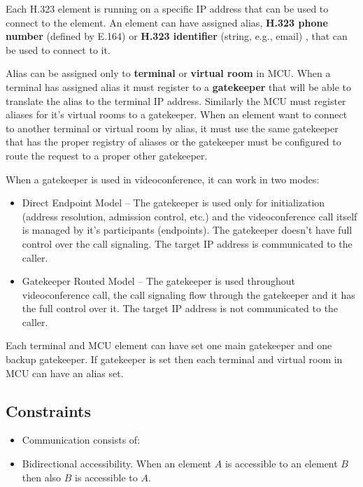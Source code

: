 Each H.323 element is running on a specific IP address that can be used to 
connect to the element. An element can have assigned alias, \textbf{H.323 
phone number} (defined by E.164) or \textbf{H.323 identifier} (string, e.g., 
email) , that can be used to connect to it.

Alias can be assigned only to \textbf{terminal} or \textbf{virtual room} in 
MCU. When a terminal has assigned alias it must register to a 
\textbf{gatekeeper} that will be able to translate the alias to the terminal 
IP address. Similarly the MCU must register aliases for it's virtual rooms to 
a gatekeeper. When an element want to connect to another terminal or virtual 
room by alias, it must use the same gatekeeper that has the proper registry 
of aliases or the gatekeeper must be configured to route the request to a 
proper other gatekeeper.

When a gatekeeper is used in videoconference, it can work in two modes:
\begin{itemize}
\item Direct Endpoint Model -- The gatekeeper is used only for initialization 
(address resolution, admission control, etc.) and the videoconference call 
itself is managed by it's participants (endpoints). The gatekeeper doesn't 
have full control over the call signaling. The target IP address is 
communicated to the caller.
\item Gatekeeper Routed Model -- The gatekeeper is used throughout 
videoconference call, the call signaling flow through the gatekeeper and it 
has the full control over it. The target IP address is not communicated to 
the caller.
\end{itemize}

Each terminal and MCU element can have set one main gatekeeper and one backup 
gatekeeper.  If gatekeeper is set then each terminal and virtual room in MCU 
can have an alias set.

\subsection{Constraints}

\begin{itemize}
\item Communication consists of:

\item Bidirectional accessibility. When an element $A$ is accessible to an 
element $B$ then also $B$ is accessible to $A$.
\end{itemize}

